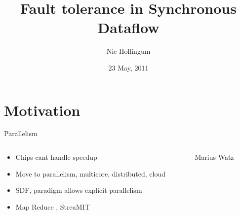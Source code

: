 \documentclass{beamer}
\title[SDF Crash Course]{Fault tolerance in Synchronous Dataflow}
\author{Nic Hollingum}
\institute{USYD}
\date{23 May, 2011}
\begin{document}
\begin{frame}
\titlepage
\end{frame}

\section{Motivation}

\begin{frame}{Parallelism}
\begin{columns}
\begin{column}{6cm}
\begin{itemize}
	\item Chips cant handle speedup
	\item Move to parallelism, multicore, distributed, cloud
	\item SDF, paradigm allows explicit parallelism
	\item Map Reduce \cite{dea08}, StreaMIT \cite{thies02}
\end{itemize}
\end{column}
\begin{column}{4cm}
\caption{Marius Watz}
\end{column}
\end{columns}
\end{frame}
\end{document}
